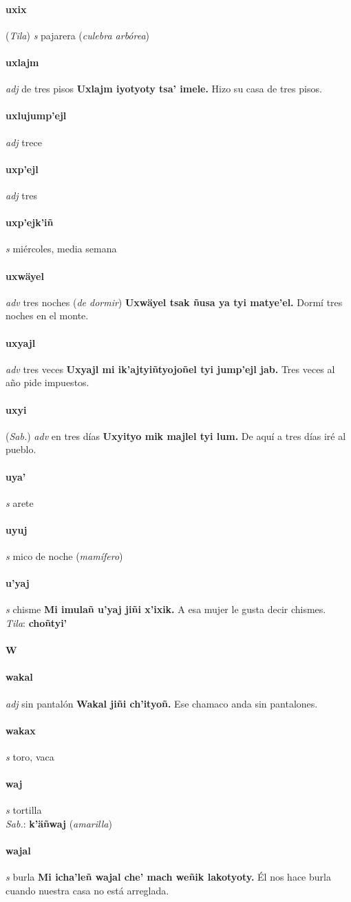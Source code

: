 \documentclass{scrbook}
\newcommand{\entry}[1]{\paragraph{#1}}
\newcommand{\alphaletter}[1]{\addsec{#1}}
\newcommand{\partofspeech}[1]{\textit{#1}}
\newcommand{\spanishtranslation}[1]{#1}
\newcommand{\clarification}[1]{(\textit{#1})}
\newcommand{\cholexample}[1]{\textbf{#1}}
\newcommand{\exampletranslation}[1]{#1}
\newcommand{\dialectvariant}[1]{\\\textit{#1}:}
\newcommand{\dialectword}[1]{\textbf{#1}}
\newcommand{\relevantdialect}[1]{(\textit{#1})}
\begin{document}
\begin{multicols}{2}
\entry{uxix}
\relevantdialect{Tila}
\partofspeech{s}
\spanishtranslation{pajarera}
\clarification{culebra arbórea}

\entry{uxlajm}
\partofspeech{adj}
\spanishtranslation{de tres pisos}
\cholexample{Uxlajm iyotyoty tsa' imele.}
\exampletranslation{Hizo su casa de tres pisos.}

\entry{uxlujump'ejl}
\partofspeech{adj}
\spanishtranslation{trece}

\entry{uxp'ejl}
\partofspeech{adj}
\spanishtranslation{tres}

\entry{uxp'ejk'iñ}
\partofspeech{s}
\spanishtranslation{miércoles, media semana}

\entry{uxwäyel}
\partofspeech{adv}
\spanishtranslation{tres noches}
\clarification{de dormir}
\cholexample{Uxwäyel tsak ñusa ya tyi matye'el.}
\exampletranslation{Dormí tres noches en el monte.}

\entry{uxyajl}
\partofspeech{adv}
\spanishtranslation{tres veces}
\cholexample{Uxyajl mi ik'ajtyiñtyojoñel tyi jump'ejl jab.}
\exampletranslation{Tres veces al año pide impuestos.}

\entry{uxyi}
\relevantdialect{Sab.}
\partofspeech{adv}
\spanishtranslation{en tres días}
\cholexample{Uxyityo mik majlel tyi lum.}
\exampletranslation{De aquí a tres días iré al pueblo.}

\entry{uya'}
\partofspeech{s}
\spanishtranslation{arete}

\entry{uyuj}
\partofspeech{s}
\spanishtranslation{mico de noche}
\clarification{mamífero}

\entry{u'yaj}
\partofspeech{s}
\spanishtranslation{chisme}
\cholexample{Mi imulañ u'yaj jiñi x'ixik.}
\exampletranslation{A esa mujer le gusta decir chismes.}
\dialectvariant{Tila}
\dialectword{choñtyi'}

\entry{W}
\alphaletter{W}

\entry{wakal}
\partofspeech{adj}
\spanishtranslation{sin pantalón}
\cholexample{Wakal jiñi ch'ityoñ.}
\exampletranslation{Ese chamaco anda sin pantalones.}

\entry{wakax}
\partofspeech{s}
\spanishtranslation{toro, vaca}

\entry{waj}
\partofspeech{s}
\spanishtranslation{tortilla}
\dialectvariant{Sab.}
\dialectword{k'äñwaj}
\clarification{amarilla}

\entry{wajal}
\partofspeech{s}
\spanishtranslation{burla}
\cholexample{Mi icha'leñ wajal che' mach weñik lakotyoty.}
\exampletranslation{Él nos hace burla cuando nuestra casa no está arreglada.}


\end{multicols}
\end{document}

